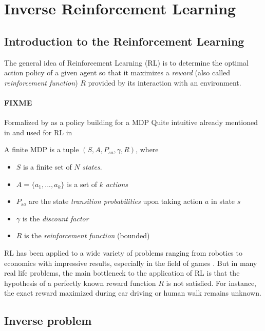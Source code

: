 \documentclass{article}
\begin{document}
\section{Inverse Reinforcement Learning \label{sec:irl}}

\subsection{Introduction to the Reinforcement Learning \label{sec:irl}}

The general idea of Reinforcement Learning (RL) is to determine the optimal action policy of a given agent so that it maximizes a \emph{reward} (also called \emph{reinforcement function}) $R$ provided by its interaction with an environment.

\paragraph{FIXME}
Formalized by \cite{Sutton98} as a policy building for a MDP
Quite intuitive already mentioned in \cite{Bellman57} and used for RL in \cite{Littman94} 

A finite MDP is a tuple $(S,A,P_{sa},\gamma,R)$, where
\begin{itemize}
    \item $S$ is a finite set of $N$ \emph{states}.
    \item $A=\{a_1,...,a_k\}$ is a set of $k$ \emph{actions} 
    \item $P_{sa}$ are the state \emph{transition probabilities} upon taking action $a$ in state $s$
    \item $\gamma$ is the \emph{discount factor}
    \item $R$ is the \emph{reinforcement function} (bounded) 
\end{itemize}

RL has been applied to a wide variety of problems ranging from robotics \cite{Kober13} to economics \cite{Tesauro02} with impressive results, especially in the field of games \cite{Silver16}. But in many real life problems, the main bottleneck to the application of RL is that the hypothesis of a perfectly known reward function $R$ is not satisfied. For instance, the exact reward maximized during car driving \cite{Shalev16} or human walk \cite{Morimoto04} remains unknown.

\subsection{Inverse problem}
\end{document}
